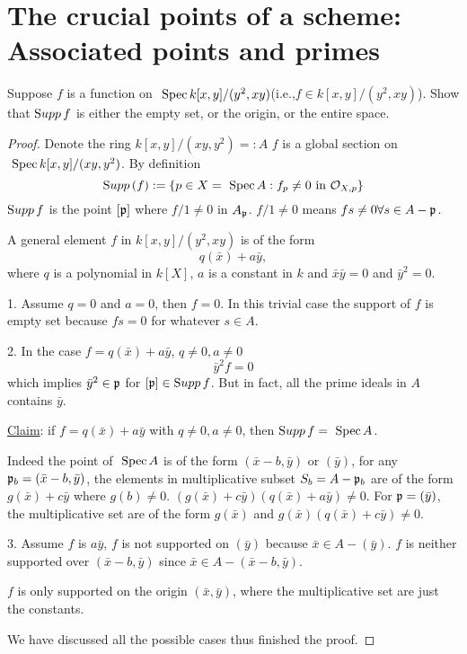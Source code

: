 \documentclass[11pt]{book} %
\begin{document}
\section{The crucial points of a scheme: Associated points and primes}
\begin{exr}
Suppose $f$ is a function on $\text{ Spec\,} k[x,y]/(y^2,xy)$(i.e.,$f\in k[x,y]/(y^2,xy)$). Show that ${\text Supp\thinspace} f$ is either the empty set, or the origin, or the entire space.
\end{exr}
\begin{proof}Denote the ring $k[x,y]/(xy, y^2)=:A$
$f$ is a global section on $\text{ Spec\,} k[x,y]/(xy, y^2)$. By definition 
$$
{\text Supp\thinspace}(f):=\{p\in X=\text{ Spec\,} A:f_p\neq 0\text{ in } {\cal O}_{X,p}\}
$$
${\text Supp\thinspace} f$ is the point $[{\mathfrak p}]$ where $f/1\neq 0$ in $A_{\mathfrak p}$. $f/1\neq 0$ means $fs\neq 0\forall s\in A-{\mathfrak p}$. 

A general element $f$ in $k[x, y]/(y^2, xy)$ is of the form
$$
q(\bar{x})+a\bar{y},
$$
where $q$ is a polynomial in $k[X]$, $a$ is a constant in $k$ and $\bar{x}\bar{y}=0$ and $\bar{y}^2=0$. 

1. Assume $q=0$ and $a=0$, then $f=0$. In this trivial case the support of $f$ is empty set because $fs=0$ for whatever $s\in A$.

2. In the case $f=q(\bar{x})+a \bar{y}$, $q\neq 0,a\neq 0$ 
$$
\bar{y}^2f=0
$$
which implies $\bar{y}^2\in{\mathfrak p}$ for $[{\mathfrak p}]\in {\text Supp\thinspace} f$. But in fact, all the prime ideals in $A$  contains $\bar{y}$. 

\underline{Claim}: if $f=q(\bar{x})+a\bar{y}$ with $q\neq 0, a\neq 0$, then ${\text Supp\thinspace} f=\text{ Spec\,} A$.

Indeed the point of $\text{ Spec\,} A$ is of the form $(\bar{x}-b,\bar{y}) $ or $(\bar{y})$, for any ${\mathfrak p}_b=(\bar{x}-b,\bar{y})$, the elements in multiplicative subset $S_b=A-{\mathfrak p}_b$ are of  the form $g(\bar{x})+c\bar{y}$ where $g(b)\neq 0$. $(g(\bar{x})+c\bar{y})(q(\bar{x})+a\bar{y})\neq 0$. For ${\mathfrak p}=(\bar{y})$, the multiplicative set are of the form $g(\bar{x})$ and $g(\bar{x})(q(\bar{x})+c\bar{y})\neq 0$.

3. Assume $f$ is $a\bar{y}$, $f$ is not supported on $(\bar{y})$ because $\bar{x}\in A-(\bar{y})$. $f$ is neither supported over $(\bar{x}-b,\bar{y})$ since $\bar{x}\in A-(\bar{x}-b,\bar{y})$.

$f$ is only supported on the origin $(\bar{x},\bar{y})$, where the multiplicative set are just the constants.

We have discussed all the possible cases thus finished the proof.
\end{proof}
\end{document}
